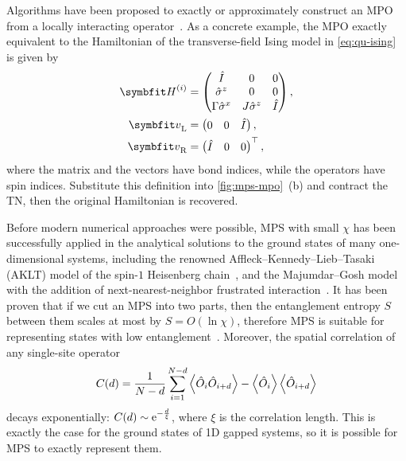 Algorithms have been proposed to exactly or approximately construct an MPO from a locally interacting operator~\cite{crosswhite2008finite, hubig2017generic, paeckel2017automated}. As a concrete example, the MPO exactly equivalent to the Hamiltonian of the transverse-field Ising model in \cref{eq:qu-ising} is given by
\begin{align}
\mH^{(i)} &= \begin{pmatrix}
\hat{I} & 0 & 0 \\
\hat{\sigma}^z & 0 & 0 \\
\Gamma \hat{\sigma}^x & J \hat{\sigma}^z & \hat{I}
\end{pmatrix}, \\
\vv_\text{L} &= \begin{pmatrix} 0 & 0 & \hat{I} \end{pmatrix}, \\
\vv_\text{R} &= \begin{pmatrix} \hat{I} & 0 & 0 \end{pmatrix}^\transpose,
\end{align}
where the matrix and the vectors have bond indices, while the operators have spin indices. Substitute this definition into \cref{fig:mps-mpo}~(b) and contract the TN, then the original Hamiltonian is recovered.

Before modern numerical approaches were possible, MPS with small $\chi$ has been successfully applied in the analytical solutions to the ground states of many one-dimensional systems, including the renowned Affleck--Kennedy--Lieb--Tasaki (AKLT) model of the spin-$1$ Heisenberg chain~\cite{affleck1987rigorous, klumper1991equivalence, fannes1992finitely}, and the Majumdar--Gosh model with the addition of next-nearest-neighbor frustrated interaction~\cite{majumdar1969next}. It has been proven that if we cut an MPS into two parts, then the entanglement entropy $S$ between them scales at most by $S = O(\ln \chi)$, therefore MPS is suitable for representing states with low entanglement~\cite{verstraete2008matrix}. Moreover, the spatial correlation of any single-site operator
\begin{equation}
C(d) = \frac{1}{N - d} \sum_{i = 1}^{N - d} \ev{\hat{O}_i \hat{O}_{i + d}} - \ev{\hat{O}_i} \ev{\hat{O}_{i + d}}
\label{eq:corr-d}
\end{equation}
decays exponentially: $C(d) \sim \mathrm{e}^{-\frac{d}{\xi}}$, where $\xi$ is the correlation length. This is exactly the case for the ground states of 1D gapped systems, so it is possible for MPS to exactly represent them.

